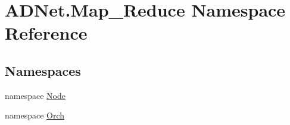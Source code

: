 \hypertarget{namespace_a_d_net_1_1_map___reduce}{}\section{A\+D\+Net.\+Map\+\_\+\+Reduce Namespace Reference}
\label{namespace_a_d_net_1_1_map___reduce}
\subsection*{Namespaces}
\begin{DoxyCompactItemize}
\item 
namespace \hyperlink{namespace_a_d_net_1_1_map___reduce_1_1_node}{Node}
\item 
namespace \hyperlink{namespace_a_d_net_1_1_map___reduce_1_1_orch}{Orch}
\end{DoxyCompactItemize}
